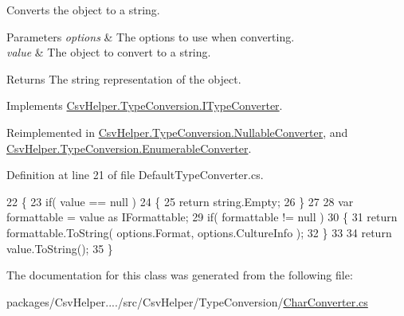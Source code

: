 Converts the object to a string. 


\begin{DoxyParams}{Parameters}
{\em options} & The options to use when converting.\\
\hline
{\em value} & The object to convert to a string.\\
\hline
\end{DoxyParams}
\begin{DoxyReturn}{Returns}
The string representation of the object.
\end{DoxyReturn}


Implements \hyperlink{a00117_a90c465c63dbcf913f38aa878f35e77c7}{Csv\-Helper.\-Type\-Conversion.\-I\-Type\-Converter}.



Reimplemented in \hyperlink{a00133_a7205cdb61d2d119582958232b3e63109}{Csv\-Helper.\-Type\-Conversion.\-Nullable\-Converter}, and \hyperlink{a00095_a7e07e9532857d748654d37db590a0e11}{Csv\-Helper.\-Type\-Conversion.\-Enumerable\-Converter}.



Definition at line 21 of file Default\-Type\-Converter.\-cs.


\begin{DoxyCode}
22         \{
23             \textcolor{keywordflow}{if}( value == null )
24             \{
25                 \textcolor{keywordflow}{return} string.Empty;
26             \}
27 
28             var formattable = value as IFormattable;
29             \textcolor{keywordflow}{if}( formattable != null )
30             \{
31                 \textcolor{keywordflow}{return} formattable.ToString( options.Format, options.CultureInfo );
32             \}
33 
34             \textcolor{keywordflow}{return} value.ToString();
35         \}
\end{DoxyCode}


The documentation for this class was generated from the following file\-:\begin{DoxyCompactItemize}
\item 
packages/\-Csv\-Helper..../src/\-Csv\-Helper/\-Type\-Conversion/\hyperlink{a00239}{Char\-Converter.\-cs}\end{DoxyCompactItemize}
